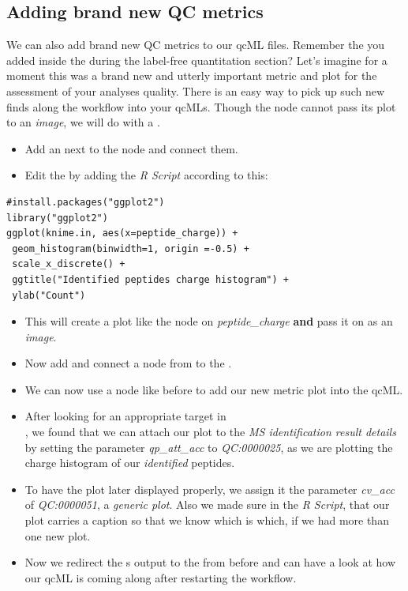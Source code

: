 \subsection{Adding brand new QC metrics}
\label{Adding brand new QC metrics}

We can also add brand new QC metrics to our qcML files. Remember the  you added inside the  during the label-free quantitation section? %
 Let's imagine for a moment this was a brand new and utterly important metric and plot for the assessment of your analyses quality. There is an easy way to pick up such new finds along the workflow into your qcMLs. Though the  node cannot pass its plot to an \textit{image}, we will do with a . 

\begin{itemize}
\item Add an  next to the  node and connect them.
\item Edit the  by adding the \textit{R Script} according to this:
\end{itemize}
\begin{lstlisting}
#install.packages("ggplot2")
library("ggplot2")
ggplot(knime.in, aes(x=peptide_charge)) + 
 geom_histogram(binwidth=1, origin =-0.5) + 
 scale_x_discrete() + 
 ggtitle("Identified peptides charge histogram") + 
 ylab("Count")
\end{lstlisting}
\begin{itemize}
\item This will create a plot like the  node on \textit{peptide\_charge} \textbf{and} pass it on as an \textit{image}. 
\item Now add and connect a  node from  to the .
\item We can now use a  node like before to add our new metric plot into the qcML.
\item After looking for an appropriate target in \\ , we found that we can attach our plot to the \textit{MS identification result details} by setting the parameter \textit{qp\_att\_acc} to \textit{QC:0000025}, as we are plotting the charge histogram of our \textit{identified} peptides.
\item To have the plot later displayed properly, we assign it the parameter \textit{cv\_acc} of \textit{QC:0000051}, a \textit{generic plot}. Also we made sure in the \textit{R Script}, that our plot carries a caption so that we know which is which, if we had more than one new plot.
\item Now we redirect the s output to the  from before and can have a look at how our qcML is coming along after restarting the workflow.
\end{itemize}

